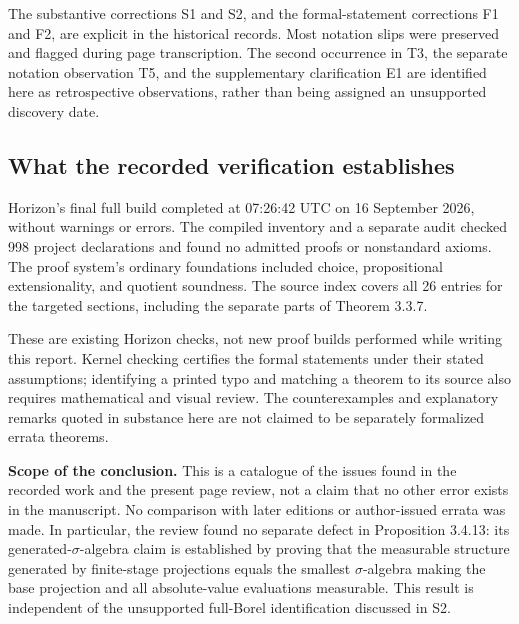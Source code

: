 \documentclass[10pt,a4paper]{article}
\begin{document}
The substantive corrections S1 and S2, and the formal-statement
corrections F1 and F2, are explicit in the historical records.
Most notation slips were preserved and flagged during page transcription.
The second occurrence in T3, the separate notation observation T5, and
the supplementary clarification E1 are identified here as retrospective
observations, rather than being assigned an unsupported discovery date.

\subsection{What the recorded verification establishes}
Horizon's final full build completed at 07:26:42 UTC on 16 September 2026,
without warnings or errors. The compiled inventory and a separate audit
checked 998 project declarations and found no admitted proofs or
nonstandard axioms. The proof system's ordinary foundations included
choice, propositional extensionality, and quotient soundness.
The source index covers all 26 entries for the targeted sections,
including the separate parts of Theorem 3.3.7.

These are existing Horizon checks, not new proof builds performed while
writing this report. Kernel checking certifies the formal statements under
their stated assumptions; identifying a printed typo and matching a
theorem to its source also requires mathematical and visual review.
The counterexamples and explanatory remarks quoted in substance here
are not claimed to be separately formalized errata theorems.

\textbf{Scope of the conclusion.} This is a catalogue of the issues found
in the recorded work and the present page review, not a claim that no
other error exists in the manuscript. No comparison with later editions
or author-issued errata was made. In particular, the review found no
separate defect in Proposition 3.4.13: its generated-$\sigma$-algebra
claim is established by proving that the measurable structure generated
by finite-stage projections equals the smallest $\sigma$-algebra making
the base projection and all absolute-value evaluations measurable.
This result is independent of the unsupported full-Borel identification
discussed in S2.
\end{document}
